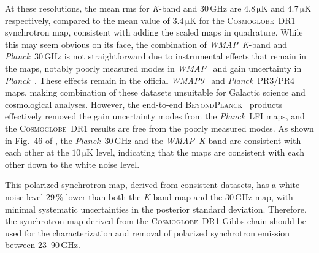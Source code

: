 \documentclass[twocolumn]{../../common/aa}
\def\WMAP{\emph{WMAP}}
\def\WMAPnine{\emph{WMAP9}}
\def\Planck{\emph{Planck}}
\newcommand{\bp}{\textsc{BeyondPlanck}}
\newcommand{\cosmoglobe}{\textsc{Cosmoglobe}}
\newcommand{\K}[0]{\textit K}
\begin{document}
At these resolutions, the mean rms for \K-band and 30\,GHz are $4.8\,\mathrm{\mu K}$ and $4.7\,\mathrm{\mu K}$ respectively, compared to the mean value of $3.4\,\mathrm{\mu K}$ for the \cosmoglobe\ DR1 synchrotron map, consistent with adding the scaled maps in quadrature.  While this may seem obvious on its face,  the combination of \WMAP\ \K-band and \Planck\ 30\,GHz is not straightforward due to instrumental effects that remain in the maps, notably poorly measured modes in \WMAP\ \citep{bennett2012,weiland:2018} and gain uncertainty in \Planck\ \citep{planck2016-l02}. These effects remain in the official \WMAPnine\ \citep{bennett2012} and \Planck\ PR3/PR4 \citep{planck2016-l02,planck2020-LVII} maps, making combination of these datasets unsuitable for Galactic science and cosmological analyses. However, the end-to-end \bp\ \citep{bp01} products effectively removed the gain uncertainty modes from the \Planck\ LFI maps, and the \cosmoglobe\ DR1 results \citep{watts2023_dr1} are free from the poorly measured modes. As shown in Fig.~46 of \citet{watts2023_dr1}, the \Planck\ 30\,GHz and the \WMAP\ \K-band are consistent with each other at the $10\,\mathrm{\mu K}$ level, indicating that the maps are consistent with each other down to the white noise level. 






This polarized synchrotron map, derived from consistent datasets, has a white noise level 29\,\% lower than both the \K-band map and the 30\,GHz map, with minimal systematic uncertainties in the posterior standard deviation. Therefore, the synchrotron map derived from the \cosmoglobe\ DR1 Gibbs chain should be used for the characterization and removal of polarized synchrotron emission between 23--90\,GHz.
\end{document}
